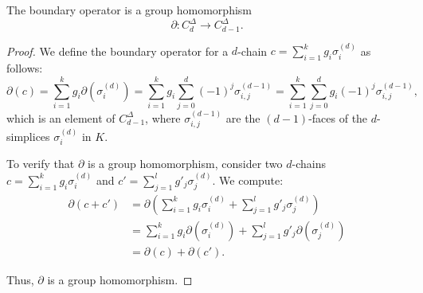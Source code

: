 \begin{lemma}
	The boundary operator is a group homomorphism
	\[
		\partial: C^{\Delta}_{d} \to C^{\Delta}_{d-1}.
	\]
\end{lemma}

\begin{proof}
	We define the boundary operator for a $d$-chain $c = \sum_{i=1}^{k}g_{i} \sigma
	_{i}^{(d)}$ as follows:
	\[
		\partial(c) = \sum_{i=1}^{k}g_{i} \partial(\sigma_{i}^{(d)}) = \sum_{i=1}^{k}
		g_{i} \sum_{j=0}^{d}(-1)^{j} \sigma_{i,j}^{(d-1)}= \sum_{i=1}^{k}\sum_{j=0}^{d}
		g_{i} (-1)^{j} \sigma_{i,j}^{(d-1)},
	\]
	which is an element of $C^{\Delta}_{d-1}$, where $\sigma_{i,j}^{(d-1)}$ are the
	$(d-1)$-faces of the $d$-simplices $\sigma_{i}^{(d)}$ in $K$.

	To verify that $\partial$ is a group homomorphism, consider two $d$-chains
	$c = \sum_{i=1}^{k}g_{i} \sigma_{i}^{(d)}$ and
	$c' = \sum_{j=1}^{l}g'_{j} \sigma_{j}^{(d)}$. We compute:
	\begin{align}
		\partial(c + c') & = \partial\left( \sum_{i=1}^{k}g_{i} \sigma_{i}^{(d)}+ \sum_{j=1}^{l}g'_{j} \sigma_{j}^{(d)}\right) \\
		                 & = \sum_{i=1}^{k}g_{i} \partial(\sigma_{i}^{(d)}) + \sum_{j=1}^{l}g'_{j} \partial(\sigma_{j}^{(d)})  \\
		                 & = \partial(c) + \partial(c').
	\end{align}

	Thus, $\partial$ is a group homomorphism.
\end{proof}


